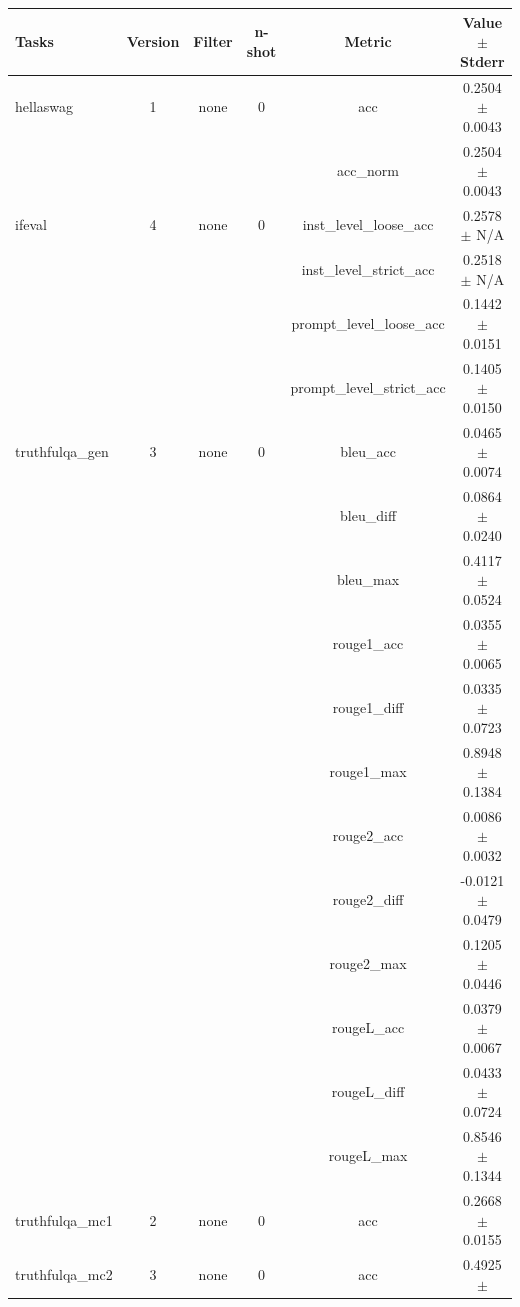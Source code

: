 \documentclass{ifacconf}
\begin{document}
\begin{strip}
\begin{minipage}{\textwidth}
			\begin{table}[H]
				\centering
				\begin{tabular}{|l|c|c|c|c|c|}
					\hline
					\textbf{Tasks} & \textbf{Version} & \textbf{Filter} & \textbf{n-shot} & \textbf{Metric} & \textbf{Value} $\pm$ \textbf{Stderr} \\ \hline
					hellaswag & 1 & none & 0 & acc & 0.2504 $\pm$ 0.0043 \\ \hline
					& & & & acc\_norm & 0.2504 $\pm$ 0.0043 \\ \hline
					ifeval & 4 & none & 0 & inst\_level\_loose\_acc & 0.2578 $\pm$ N/A \\ \hline
					& & & & inst\_level\_strict\_acc & 0.2518 $\pm$ N/A \\ \hline
					& & & & prompt\_level\_loose\_acc & 0.1442 $\pm$ 0.0151 \\ \hline
					& & & & prompt\_level\_strict\_acc & 0.1405 $\pm$ 0.0150 \\ \hline
					truthfulqa\_gen & 3 & none & 0 & bleu\_acc & 0.0465 $\pm$ 0.0074 \\ \hline
					& & & & bleu\_diff & 0.0864 $\pm$ 0.0240 \\ \hline
					& & & & bleu\_max & 0.4117 $\pm$ 0.0524 \\ \hline
					& & & & rouge1\_acc & 0.0355 $\pm$ 0.0065 \\ \hline
					& & & & rouge1\_diff & 0.0335 $\pm$ 0.0723 \\ \hline
					& & & & rouge1\_max & 0.8948 $\pm$ 0.1384 \\ \hline
					& & & & rouge2\_acc & 0.0086 $\pm$ 0.0032 \\ \hline
					& & & & rouge2\_diff & -0.0121 $\pm$ 0.0479 \\ \hline
					& & & & rouge2\_max & 0.1205 $\pm$ 0.0446 \\ \hline
					& & & & rougeL\_acc & 0.0379 $\pm$ 0.0067 \\ \hline
					& & & & rougeL\_diff & 0.0433 $\pm$ 0.0724 \\ \hline
					& & & & rougeL\_max & 0.8546 $\pm$ 0.1344 \\ \hline
					truthfulqa\_mc1 & 2 & none & 0 & acc & 0.2668 $\pm$ 0.0155 \\ \hline
					truthfulqa\_mc2 & 3 & none & 0 & acc & 0.4925 $\pm$ \text{NaN} \\ \hline
				\end{tabular}
				\label{tab:qwen25_q5km}
			\end{table}
			

\end{minipage}
\end{strip}
\end{document}

